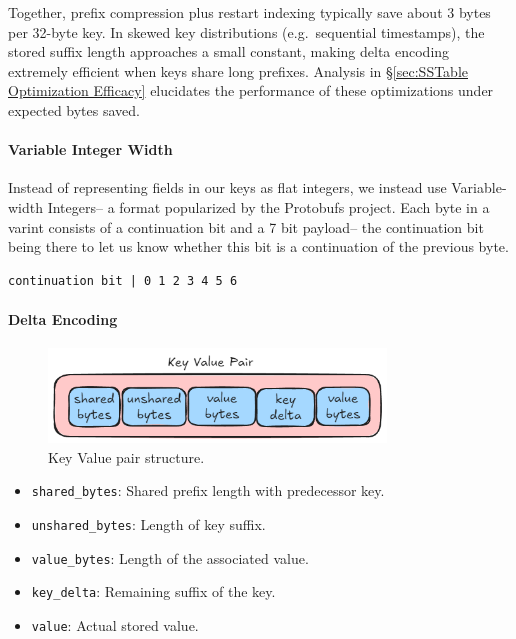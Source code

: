 \documentclass[10pt]{article}
\begin{document}
Together, prefix compression plus restart indexing typically save about 3 bytes per 32-byte key.  
In skewed key distributions (e.g.\ sequential timestamps), the stored suffix length approaches a small constant, making delta encoding extremely efficient when keys share long prefixes.
Analysis in \S\ref{sec:SSTable Optimization Efficacy} elucidates the performance of these optimizations under expected bytes saved.

\paragraph{Variable Integer Width}
Instead of representing fields in our keys as flat integers, we instead use Variable-width Integers– a format popularized by the Protobufs project. Each byte in a varint consists of a continuation bit and a 7 bit payload– the continuation bit being there to let us know whether this bit is a continuation of the previous byte. 
\begin{verbatim}
continuation bit | 0 1 2 3 4 5 6
\end{verbatim}

\paragraph{Delta Encoding}

\begin{figure}[htbp]
  \centering
  \includegraphics[width=0.8\textwidth]{key_value_pair.png}
  \caption{Key Value pair structure.}\label{fig:Key Value Pair}
\end{figure}

\begin{itemize}[itemsep=0pt, parsep=0pt]
  \item \texttt{shared\_bytes}: Shared prefix length with predecessor key.
  \item \texttt{unshared\_bytes}: Length of key suffix.
  \item \texttt{value\_bytes}: Length of the associated value.
  \item \texttt{key\_delta}: Remaining suffix of the key.
  \item \texttt{value}: Actual stored value.
\end{itemize}
\end{document}

